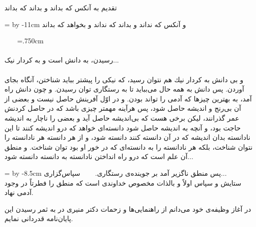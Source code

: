 \newpage
\begin{acknowledgementpage}

\vspace{4cm}

{\nastaliq
{\Large
 تقدیم به آنکس که بداند و بداند که بداند 
\vspace{1.5cm}

\newdimen\xa
\xa=\textwidth
\advance \xa by -11cm
\hspace{\xa}
و آنکس که نداند و بداند که نداند و بخواهد که بداند
}}
\end{acknowledgementpage}
\newpage
\thispagestyle{empty}
\clearpage
~~~
\newpage
\thispagestyle{empty}
\baselineskip=.750cm
\ \\ \\
 
{\nastaliq
رسيدن، به دانش است و به كردار نیک...%
}\\
\vspace{.5cm}\\
{\scriptsize\nastaliq
{
 و بی دانش به كردار نيك هم نتوان رسيد، كه نيكى را پيشتر ببايد شناختن، آنگاه بجاى آوردن. پس دانش به همه حال مى‌ببايد تا به رستگارى توان رسيدن. و چون دانش راه آمد، به بهترين چيزها كه آدمى را تواند بودن. و در اوّل آفرينش حاصل نيست و بعضى از آن بى‌رنج و انديشه حاصل شود، پس هرآينه مهمتر چيزى باشد كه در حاصل كردنش عمر گذرانند، ليكن برخى هست كه بى‌انديشه حاصل آيد و بعضى را ناچار به انديشه حاجت بود، و آنچه به انديشه حاصل شود دانسته‌اى خواهد كه درو انديشه كنند تا اين نادانسته بدان انديشه كه در آن دانسته كنند دانسته شود، و از هر دانسته هر نادانسته را نتوان شناخت، بلكه هر نادانسته را به دانسته‌اى كه در خور او بود توان شناخت. و منطق آن علم است كه درو راه انداختن نادانسته به دانسته دانسته شود...
 }}
 
\vspace{.5cm}
{\nastaliq
\newdimen\xb
\xb=\textwidth
\advance \xb by -8.5cm
\hspace{\xb}
پس منطق ناگزير آمد بر جوينده‌ی رستگاری.
}
\newpage
\thispagestyle{empty}
\clearpage
~~~
\newpage
\thispagestyle{empty}
{\nastaliq
سپاس‌گزاری...
}
\\[2cm]
ستایش و سپاس اولاً و بالذات مخصوص خداوندی است که منطق را فطرتاً در وجود آدمی نهاد.

در آغاز وظیفه‌ی خود می‌دانم از راهنمایی‌ها و زحمات دکتر منیری در به ثمر رسیدن این پایان‌نامه قدردانی نمایم.

